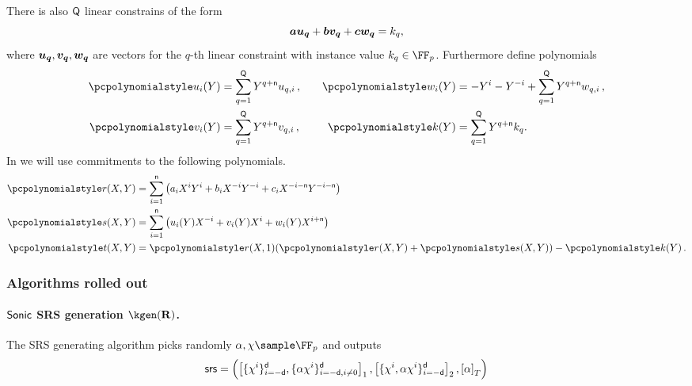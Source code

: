 \documentclass[runningheads,11pt]{llncs}
\let\spvec\vec
\let\vec\accentvec
\let\spvec\vec
\let\vec\spvec
\def\vec#1{\mathchoice{\mbox{\boldmath$\displaystyle#1$}}
  {\mbox{\boldmath$\textstyle#1$}} {\mbox{\boldmath$\scriptstyle#1$}}
  {\mbox{\boldmath$\scriptscriptstyle#1$}}}
\begin{document}
There is also $\mathsf{Q}$ linear constrains of the form
\[
  \va \vec{u_q} + \vb \vec{v_q} + \vc \vec{w_q} = k_q,
\]
where $\vec{u_q}, \vec{v_q}, \vec{w_q}$ are vectors for the $q$-th linear
constraint with instance value $k_q \in \FF_p$. Furthermore define polynomials
\begin{equation}
  \begin{split}
    \p{u_i}(Y) & = \sum_{q = 1}^\linconstr Y^{q + \multconstr} u_{q, i}\,,\\
    \p{v_i}(Y) & = \sum_{q = 1}^\linconstr Y^{q + \multconstr} v_{q, i}\,,\\
  \end{split}
  \qquad
  \begin{split}
    \p{w_i}(Y) & = -Y^i - Y^{-i} + \sum_{q = 1}^\linconstr Y^{q +
      \multconstr} w_{q, i}\,,\\
    \p{k}(Y) & = \sum_{q = 1}^\linconstr Y^{q + \multconstr} k_{q}.
  \end{split}
\end{equation}
In \sonic{} we will use commitments to the following polynomials.
\begin{align*}
  \pr(X, Y) & = \sum_{i = 1}^{\multconstr} \left(a_i X^i Y^i + b_i X^{-i} Y^{-i}
              + c_i X^{-i - \multconstr} Y^{-i - \multconstr}\right) \\
  \p{s}(X, Y) & = \sum_{i = 1}^{\multconstr} \left( u_i (Y) X^{-i} +
                v_i(Y) X^i + w_i(Y) X^{i + \multconstr}\right)\\
  \pt(X, Y) & = \pr(X, 1) (\pr(X, Y) + \p{s}(X, Y)) - \p{k}(Y)\,.
\end{align*}
	
\subsubsection{Algorithms rolled out}
\paragraph{${\textnormal{\textsf{Sonic}}}$ SRS generation $\kgen(\REL)$.} The SRS generating algorithm picks
randomly $\alpha, \chi \sample \FF_p$ and outputs
	\[
      \mathsf{srs} = \left( \left[\{\chi^i\}_{i = -\mathsf{d}}^{\mathsf{d}},
          \{\alpha \chi^i\}_{i = -\mathsf{d}, i \neq 0}^{\mathsf{d}}\right]_{1},
        \left[\{\chi^i, \alpha \chi^i\}_{i = - \mathsf{d}}^{\mathsf{d}}\right]_{2},
        \left[\alpha\right]_{T} \right)
	\]
\end{document}
